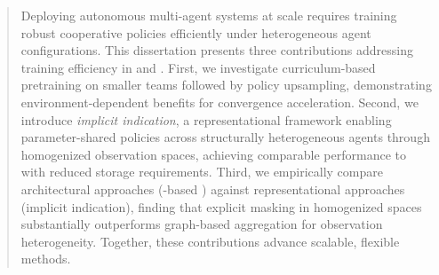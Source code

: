 % 
\begin{abstract}%

Deploying autonomous multi-agent systems at scale requires training robust
cooperative policies efficiently under heterogeneous agent configurations.
This dissertation presents three contributions addressing training efficiency
in  and . First, we investigate curriculum-based
pretraining on smaller teams followed by policy upsampling, demonstrating
environment-dependent benefits for convergence acceleration.
Second, we introduce \textit{implicit indication}, a representational
framework enabling parameter-shared policies across structurally heterogeneous
agents through homogenized observation spaces, achieving comparable performance
to  with reduced storage requirements.
Third, we empirically compare architectural approaches (-based )
against representational approaches (implicit indication), finding that
explicit masking in homogenized spaces substantially outperforms graph-based
aggregation for observation heterogeneity. Together,
these contributions advance scalable, flexible  methods.

\end{abstract}